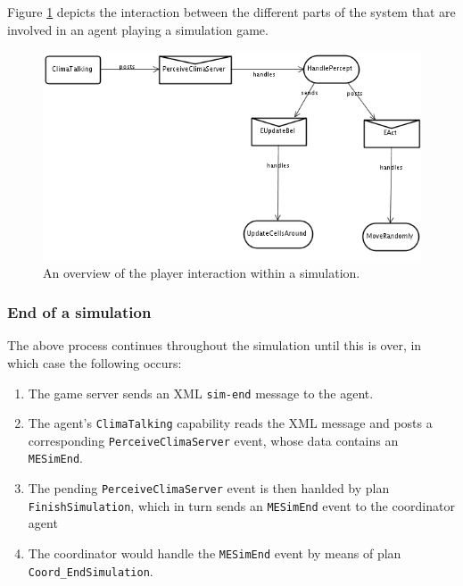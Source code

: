 \documentclass[10pt]{article}
\begin{document}
Figure \ref{fig:design_simcycle} depicts the interaction between the different parts of the system that are involved in an agent playing a simulation game.


\begin{figure}
\begin{center}
\includegraphics[width=12cm]{PlayerSimCycle}
\end{center}
\caption{An overview of the player interaction within a simulation.}
\label{fig:design_simcycle}
\end{figure}



\subsubsection*{End of a simulation}

The above process continues throughout the simulation until this is over, in which case the following occurs:

\begin{enumerate}
 \item The game server sends an XML \texttt{sim-end} message to the agent.
 \item The agent's \texttt{ClimaTalking} capability reads the XML message
	and posts a corresponding \texttt{PerceiveClimaServer} event, whose
	data contains an \texttt{MESimEnd}.

\item The pending \texttt{PerceiveClimaServer} event is then hanlded by plan
\texttt{FinishSimulation}, which in turn sends an \texttt{MESimEnd} event to the
coordinator agent

\item The coordinator would handle the \texttt{MESimEnd} event by means of plan
\texttt{Coord\_EndSimulation}.
\end{enumerate}
\end{document}
